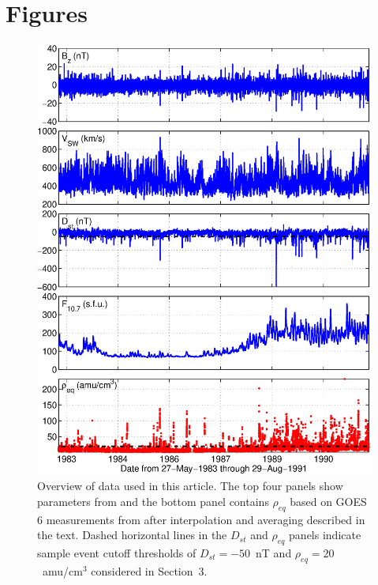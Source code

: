 \documentclass[draft,linenumbers]{agujournal}
\begin{document}




\section{Figures}

\begin{figure}[htp!]
	\centering
	\includegraphics[scale=0.45]{UsedFigures/2016SW001507R-p01.eps}
	\caption{Overview of data used in this article. The top four panels show parameters from \citet{Kondrashov2014ReconstructionOfGaps} and the bottom panel contains $\rho_{eq}$ based on GOES 6 measurements from \citet{Denton} after interpolation and averaging described in the text. Dashed horizontal lines in the $D_{st}$ and $\rho_{eq}$ panels indicate sample event cutoff thresholds of $D_{st} = -50$~nT and $\rho_{eq} = 20$~amu/cm$^3$ considered in Section~3.}
	\label{fig:AllData}
\end{figure}
\end{document}
